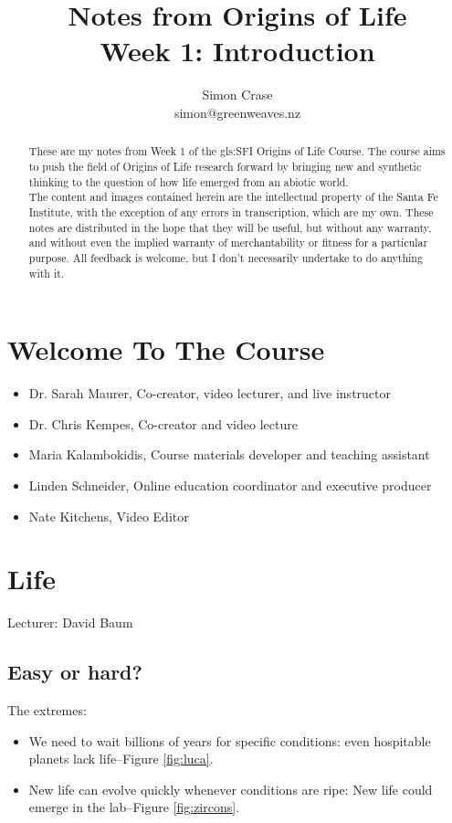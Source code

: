 \documentclass[]{article}
\title{
	Notes from Origins of Life\\
	Week 1: Introduction
}
\author{Simon Crase\\simon@greenweaves.nz}
\begin{document}
\maketitle

\begin{abstract}
    These are my notes from Week 1 of the \gls{gls:SFI} Origins of Life Course\cite{sfi2019}. The course aims to push the field of Origins of Life research forward by bringing new and synthetic thinking to the question of how life emerged from an abiotic world.\\
    The content and images contained herein are the intellectual property of the Santa Fe Institute, with the exception of any errors in transcription, which are my own.
    These notes are distributed in the hope that they will be useful,
    but without any warranty, and without even the implied warranty of
     merchantability or fitness for a particular purpose. All feedback is welcome,
    but I don't necessarily undertake to do anything with it.
\end{abstract}

\setcounter{tocdepth}{2}
\tableofcontents


\section{Welcome To The Course}
\begin{itemize}
	\item Dr. Sarah Maurer, Co-creator, video lecturer, and live instructor
	\item Dr. Chris Kempes, Co-creator and video lecture
	\item Maria Kalambokidis, Course materials developer and teaching assistant
	\item Linden Schneider, Online education coordinator and executive producer
	\item Nate Kitchens, Video Editor
\end{itemize}
\section{Life}
Lecturer: David Baum
\subsection{Easy or hard?}
The extremes:
\begin{itemize}
	\item We need to wait billions of years for specific conditions: even hospitable planets lack life--Figure \ref{fig:luca}.
	\item New life can evolve quickly whenever conditions are ripe:  New life could emerge in the lab--Figure \ref{fig:zircons}.
\end{itemize}
\end{document}
